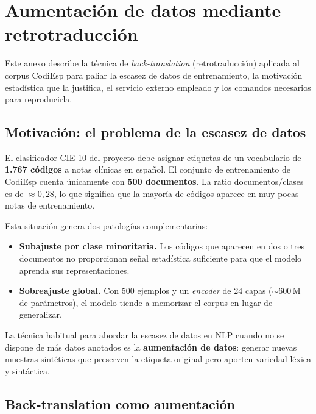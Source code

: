 \chapter{Aumentación de datos mediante retrotraducción}
\label{cap:AnexoL}

Este anexo describe la técnica de \emph{back-translation} (retrotraducción) aplicada al corpus CodiEsp para paliar la escasez de datos de entrenamiento, la motivación estadística que la justifica, el servicio externo empleado y los comandos necesarios para reproducirla.

\section{Motivación: el problema de la escasez de datos}

El clasificador CIE-10 del proyecto debe asignar etiquetas de un vocabulario de \textbf{1.767 códigos} a notas clínicas en español. El conjunto de entrenamiento de CodiEsp cuenta únicamente con \textbf{500 documentos}. La ratio documentos/clases es de $\approx 0{,}28$, lo que significa que la mayoría de códigos aparece en muy pocas notas de entrenamiento.

Esta situación genera dos patologías complementarias:

\begin{itemize}
  \item \textbf{Subajuste por clase minoritaria.} Los códigos que aparecen en dos o tres documentos no proporcionan señal estadística suficiente para que el modelo aprenda sus representaciones.
  \item \textbf{Sobreajuste global.} Con 500 ejemplos y un \emph{encoder} de 24 capas ($\sim$600\,M de parámetros), el modelo tiende a memorizar el corpus en lugar de generalizar.
\end{itemize}

La técnica habitual para abordar la escasez de datos en NLP cuando no se dispone de más datos anotados es la \textbf{aumentación de datos}: generar nuevas muestras sintéticas que preserven la etiqueta original pero aporten variedad léxica y sintáctica.

\section{Back-translation como aumentación}

